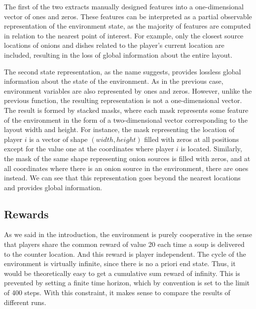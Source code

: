 The first of the two extracts manually designed features into a one-dimensional vector of ones and zeros. 
These features can be interpreted as a partial observable representation of the environment state, as the majority of features are computed in relation to the nearest point of interest.
For example, only the closest source locations of onions and dishes related to the player's current location are included, resulting in the loss of global information about the entire layout.

The second state representation, as the name suggests, provides lossless global information about the state of the environment.
As in the previous case, environment variables are also represented by ones and zeros. 
However, unlike the previous function, the resulting representation is not a one-dimensional vector.
The result is formed by stacked masks, where each mask represents some feature of the environment in the form of a two-dimensional vector corresponding to the layout width and height.
For instance, the mask representing the location of player $i$ is a vector of shape $(width, height)$ filled with zeros at all positions except for the value one at the coordinates where player $i$ is located.
Similarly, the mask of the same shape representing onion sources is filled with zeros, and at all coordinates where there is an onion source in the environment, there are ones instead.
We can see that this representation goes beyond the nearest locations and provides global information.

\subsection{Rewards}
As we said in the introduction, the environment is purely cooperative in the sense that players share the common reward of value 20 each time a soup is delivered to the counter location.
And this reward is player independent. 
The cycle of the environment is virtually infinite, since there is no a priori end state. 
Thus, it would be theoretically easy to get a cumulative sum reward of infinity.
This is prevented by setting a finite time horizon, which by convention is set to the limit of 400 steps.
With this constraint, it makes sense to compare the results of different runs.

